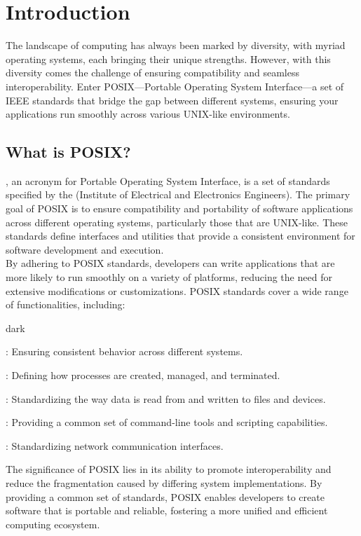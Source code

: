 \section{Introduction}
\label{sec:introduction}
The landscape of computing has always been marked by diversity, with myriad operating systems, each bringing their unique strengths. However, with this diversity comes the challenge of ensuring compatibility and seamless interoperability.
Enter POSIX—Portable Operating System Interface—a set of IEEE standards that bridge the gap between different systems, ensuring your applications run smoothly across various UNIX-like environments.

\subsection{What is POSIX?}
\label{sec:introduction:sub:what}
, an acronym for Portable Operating System Interface, is a set of standards specified by the  (Institute of Electrical and Electronics Engineers).
The primary goal of POSIX is to ensure compatibility and portability of software applications across different operating systems, particularly those that are UNIX-like. These standards define interfaces and utilities that provide a consistent environment for software development and execution.
\\

By adhering to POSIX standards, developers can write applications that are more likely to run smoothly on a variety of platforms, reducing the need for extensive modifications or customizations.
POSIX standards cover a wide range of functionalities, including:
\bigskip
\begin{baseBoxOne}{}{dark}
    \begin{posnexItemize} 
        \item[\sA] : Ensuring consistent behavior across different systems. 
        \item[\sA] : Defining how processes are created, managed, and terminated. 
        \item[\sA] : Standardizing the way data is read from and written to files and devices. 
        \item[\sA] : Providing a common set of command-line tools and scripting capabilities. 
        \item[\sA] : Standardizing network communication interfaces.
    \end{posnexItemize}
\end{baseBoxOne}
\bigskip
The significance of POSIX lies in its ability to promote interoperability and reduce the fragmentation caused by differing system implementations.
By providing a common set of standards, POSIX enables developers to create software that is portable and reliable, fostering a more unified and efficient computing ecosystem.

